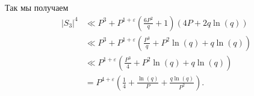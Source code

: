 \documentclass[12pt,a4paper]{article}
\begin{document}
    Так мы получаем
    \begin{align*}
        |S_3|^4
        &\ll P^3 + P^{1+\varepsilon} \left(\frac{6P^2}{q} + 1\right) (4P + 2q \ln(q))\\
        &\ll P^3 + P^{1+\varepsilon} \left(\frac{P^3}{q} + P^2  \ln(q) + q \ln(q)\right)\\
        &\ll P^{1+\varepsilon} \left(\frac{P^3}{4} + P^2 \ln(q) + q\ln(q)\right)\\
        &= P^{4+\varepsilon} \left(\frac{1}{4} + \frac{\ln(q)}{P} + \frac{q \ln(q)}{P^2}\right).
    \end{align*}
\end{document}
